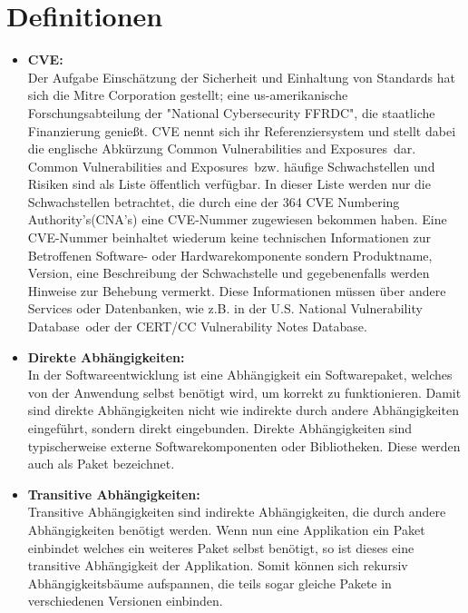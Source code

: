 \section{Definitionen} \label{sec:Definitionen}
\begin{itemize}
    \item \textbf{\ac{CVE}:} \\
    Der Aufgabe Einschätzung der Sicherheit und Einhaltung von Standards hat sich die Mitre Corporation gestellt; eine us-amerikanische Forschungsabteilung der "National Cybersecurity FFRDC", die staatliche Finanzierung genießt.
    \ac{CVE} nennt sich ihr Referenziersystem und stellt dabei die englische Abkürzung \glqq Common Vulnerabilities and Exposures\grqq~dar.
    \\
    \glqq Common Vulnerabilities and Exposures\grqq~bzw. häufige Schwachstellen und Risiken sind als Liste öffentlich verfügbar.
    In dieser Liste werden nur die Schwachstellen betrachtet, die durch eine der 364 \glqq \ac{CVE} Numbering Authority's\grqq (CNA's) eine \ac{CVE}-Nummer zugewiesen bekommen haben.\cite{}
    Eine \ac{CVE}-Nummer beinhaltet wiederum keine technischen Informationen zur Betroffenen Software- oder Hardwarekomponente sondern Produktname, Version, eine Beschreibung der Schwachstelle und gegebenenfalls werden Hinweise zur Behebung vermerkt.
    Diese Informationen müssen über andere Services oder Datenbanken, wie z.B. in der \glqq U.S. National Vulnerability Database\grqq~oder der \glqq CERT/CC Vulnerability Notes Database\grqq.

    \item \textbf{Direkte Abhängigkeiten:} \\
    In der Softwareentwicklung ist eine Abhängigkeit ein Softwarepaket, welches von der Anwendung selbst benötigt wird, um korrekt zu funktionieren.
    Damit sind direkte Abhängigkeiten nicht wie indirekte durch andere Abhängigkeiten eingeführt, sondern direkt eingebunden.
    Direkte Abhängigkeiten sind typischerweise externe Softwarekomponenten oder Bibliotheken.
    Diese werden auch als Paket bezeichnet. 

    \item \textbf{Transitive Abhängigkeiten:} \\
    Transitive Abhängigkeiten sind indirekte Abhängigkeiten, die durch andere Abhängigkeiten benötigt werden.
    Wenn nun eine Applikation ein Paket einbindet welches ein weiteres Paket selbst benötigt, so ist dieses eine transitive Abhängigkeit der Applikation.
    Somit können sich rekursiv Abhängigkeitsbäume aufspannen, die teils sogar gleiche Pakete in verschiedenen Versionen einbinden.
    

\end{itemize}
